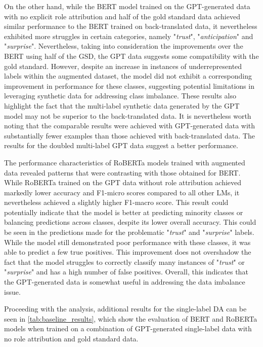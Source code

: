 \documentclass[manuscript]{clv3}
\begin{document}
On the other hand, while the BERT model trained on the GPT-generated data with no explicit role attribution and half of the gold standard data achieved similar performance to the BERT trained on back-translated data, it nevertheless exhibited more struggles in certain categories, namely "\textit{trust}", "\textit{anticipation}" and "\textit{surprise}". Nevertheless, taking into consideration the improvements over the BERT using half of the GSD, the GPT data suggests some compatibility with the gold standard. However, despite an increase in instances of underrepresented labels within the augmented dataset, the model did not exhibit a corresponding improvement in performance for these classes, suggesting potential limitations in leveraging synthetic data for addressing class imbalance. These results also highlight the fact that the multi-label synthetic data generated by the GPT model may not be superior to the back-translated data. It is nevertheless worth noting that the comparable results were achieved with GPT-generated data with substantially fewer examples than those achieved with back-translated data. The results for the doubled multi-label GPT data suggest a better performance.

The performance characteristics of RoBERTa models trained with augmented data revealed patterns that were contrasting with those obtained for BERT. While RoBERTa trained on the GPT data without role attribution achieved markedly lower accuracy and F1-micro scores compared to all other LMs, it nevertheless achieved a slightly higher F1-macro score. This result could potentially indicate that the model is better at predicting minority classes or balancing predictions across classes, despite its lower overall accuracy. This could be seen in the predictions made for the problematic "\textit{trust}" and "\textit{surprise}" labels. While the model still demonstrated poor performance with these classes, it was able to predict a few true positives. This improvement does not overshadow the fact that the model struggles to correctly classify many instances of "\textit{trust}" or "\textit{surprise}" and has a high number of false positives. Overall, this indicates that the GPT-generated data is somewhat useful in addressing the data imbalance issue. 

Proceeding with the analysis, additional results for the single-label DA can be seen in \autoref{tab:baseline_results}, which show the evaluation of BERT and RoBERTa models when trained on a combination of GPT-generated single-label data with no role attribution and gold standard data. 
\end{document}
